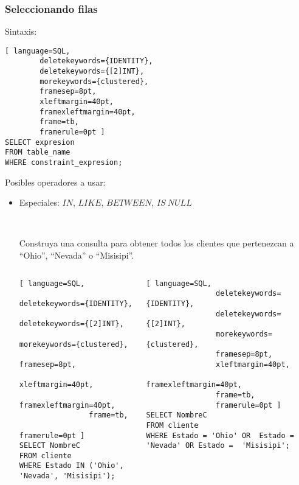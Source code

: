 \begin{frame}[fragile]
	
	\frametitle{Seleccionando filas}
	
	Sintaxis:
	\begin{lstlisting}[ language=SQL,
		deletekeywords={IDENTITY},
		deletekeywords={[2]INT},
		morekeywords={clustered},
		framesep=8pt,
		xleftmargin=40pt,
		framexleftmargin=40pt,
		frame=tb,
		framerule=0pt ]
SELECT expresion
FROM table_name
WHERE constraint_expresion;
\end{lstlisting} 
	
	Posibles operadores a usar: 
	\begin{itemize}
		
		\item Especiales: $IN$, $LIKE$, $BETWEEN$, $IS\ NULL$
		
		\pause 
		
		\ 
		
		Construya una consulta para obtener todos los clientes que pertenezcan a ``Ohio'', ``Nevada'' o ``Misisipi''.
		
		\pause
		
		\begin{columns}[t]
			\begin{lstlisting}[ language=SQL,
				deletekeywords={IDENTITY},
				deletekeywords={[2]INT},
				morekeywords={clustered},
				framesep=8pt,
				xleftmargin=40pt,
				framexleftmargin=40pt,
				frame=tb,
				framerule=0pt ]
SELECT NombreC 
FROM cliente 
WHERE Estado IN ('Ohio', 'Nevada', 'Misisipi');
\end{lstlisting}
			
			\begin{lstlisting}[ language=SQL,
				deletekeywords={IDENTITY},
				deletekeywords={[2]INT},
				morekeywords={clustered},
				framesep=8pt,
				xleftmargin=40pt,
				framexleftmargin=40pt,
				frame=tb,
				framerule=0pt ]
SELECT NombreC 
FROM cliente 
WHERE Estado = 'Ohio' OR  Estado = 'Nevada' OR Estado =  'Misisipi';
\end{lstlisting}
			
		\end{columns}
		
	\end{itemize}
	
\end{frame}


